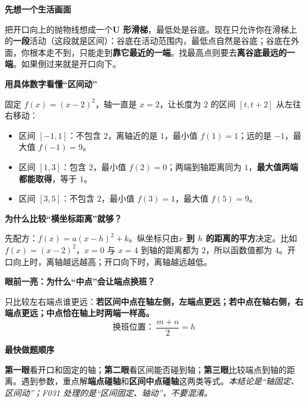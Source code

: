 \begin{explanationbox}
\textbf{\textcolor{CExplanation}{先想一个生活画面}}

把开口向上的抛物线想成一个\textbf{U 形滑梯}，最低处是谷底。现在只允许你在滑梯上的\textbf{一段}活动（这段就是区间）：谷底在活动范围内，最低点自然是谷底；谷底在外面，你根本走不到，只能走到\textbf{靠它最近的一端}。找最高点则要去\textbf{离谷底最远的一端}。如果倒过来就是开口向下。

\medskip
\textbf{\textcolor{CExplanation}{用具体数字看懂“区间动”}}

固定 $f(x)=(x-2)^2$，轴一直是 $x=2$，让长度为 $2$ 的区间 $[t,t+2]$ 从左往右移动：
\begin{center}

\end{center}
\begin{itemize}[leftmargin=*,itemsep=0.35em]
  \item 区间 $[-1,1]$：不包含 $2$，离轴近的是 $1$，最小值 $f(1)=1$；远的是 $-1$，最大值 $f(-1)=9$。
  \item 区间 $[1,3]$：包含 $2$，最小值 $f(2)=0$；两端到轴距离同为 $1$，\textbf{最大值两端都能取得}，等于 $1$。
  \item 区间 $[3,5]$：不包含 $2$，最小值 $f(3)=1$，最大值 $f(5)=9$。
\end{itemize}

\textbf{\textcolor{CExplanation}{为什么比较“横坐标距离”就够？}}

先配方：$f(x)=a(x-h)^2+k$。纵坐标只由\textbf{$x$ 到 $h$ 的距离的平方}决定。比如 $f(x)=(x-2)^2$，$x=0$ 与 $x=4$ 到轴的距离都为 $2$，所以函数值都为 $4$。开口向上时，离轴越远越高；开口向下时，离轴越远越低。

\medskip
\textbf{\textcolor{CExplanation}{眼前一亮：为什么“中点”会让端点换班？}}

只比较左右端点谁更远：\textbf{若区间中点在轴左侧，左端点更远；若中点在轴右侧，右端点更远；中点恰在轴上时两端一样高。}
\[
\boxed{\text{换班位置：}\ \frac{m+n}{2}=h}
\]
\begin{center}

\end{center}

\textbf{\textcolor{CExplanation}{最快做题顺序}}

\textbf{第一眼}看开口和固定的轴；\textbf{第二眼}看区间能否碰到轴；\textbf{第三眼}比较端点到轴的距离。遇到参数，重点解\textbf{端点碰轴}和\textbf{区间中点碰轴}这两类等式。\textit{本结论是“轴固定、区间动”；F031 处理的是“区间固定、轴动”，不要混淆。}
\end{explanationbox}
